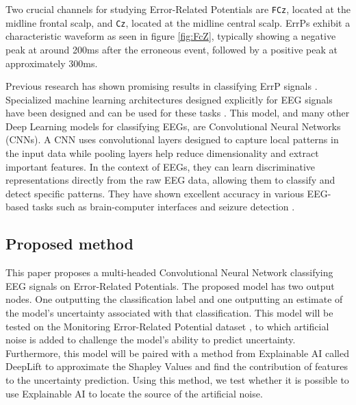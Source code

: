 Two crucial channels for studying Error-Related Potentials are \verb|FCz|, located at the midline frontal scalp, and \verb|Cz|, located at the midline central scalp. ErrPs exhibit a characteristic waveform as seen in figure \ref{fig:FcZ}, typically showing a negative peak at around 200ms after the erroneous event, followed by a positive peak at approximately 300ms.

Previous research has shown promising results in classifying ErrP signals \citep{correia2021error}. Specialized machine learning architectures designed explicitly for EEG signals have been designed and can be used for these tasks \citep{lawhern2018eegnet}. This model, and many other Deep Learning models for classifying EEGs, are Convolutional Neural Networks (CNNs). A CNN uses convolutional layers designed to capture local patterns in the input data while pooling layers help reduce dimensionality and extract important features. In the context of EEGs, they can learn discriminative representations directly from the raw EEG data, allowing them to classify and detect specific patterns. They have shown excellent accuracy in various EEG-based tasks such as brain-computer interfaces \citep{cecotti2010convolutional} and seizure detection \citep{zhou2018epileptic}.

\subsection{Proposed method}

This paper proposes a multi-headed Convolutional Neural Network classifying EEG signals on Error-Related Potentials. The proposed model has two output nodes. One outputting the classification label and one outputting an estimate of the model's uncertainty associated with that classification. This model will be tested on the Monitoring Error-Related Potential dataset \citep{chavarriaga2010learning}, to which artificial noise is added to challenge the model's ability to predict uncertainty. Furthermore, this model will be paired with a method from Explainable AI called DeepLift to approximate the Shapley Values and find the contribution of features to the uncertainty prediction. Using this method, we test whether it is possible to use Explainable AI to locate the source of the artificial noise.